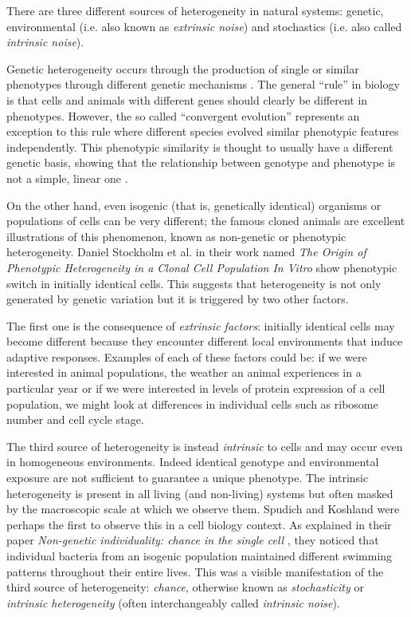 \documentclass[12pt,a4paper]{report}
\begin{document}
There are three different sources of heterogeneity in natural systems: genetic, environmental (i.e. also known as \emph{extrinsic noise}) and stochastics (i.e. also called \emph{intrinsic noise}).

Genetic heterogeneity occurs through the production of single or similar phenotypes through different genetic mechanisms \cite{GeneticHeterogeneity}. The general ``rule'' in biology is that cells and animals with different genes should clearly be different in phenotypes. However, the so called ``convergent evolution'' represents an exception to this rule where different species evolved similar phenotypic features independently. This phenotypic similarity is thought to usually have a different genetic basis, showing that the relationship between genotype and phenotype is not a simple, linear one \cite{genotypevsphenotype}. 

On the other hand, even isogenic (that is, genetically identical) organisms or populations of cells can be very different; the famous cloned animals are excellent illustrations of this phenomenon, known as non-genetic or phenotypic heterogeneity. Daniel Stockholm et al. in their work named \emph{The Origin of Phenotypic Heterogeneity in a Clonal Cell Population In Vitro}\cite{heterogeneityinclones} show phenotypic switch in initially identical cells. This suggests that heterogeneity is not only generated by genetic variation but it is triggered by two other factors.

The first one is the consequence of \emph{extrinsic factors}: initially identical cells may become different because they encounter different local environments that induce adaptive responses. Examples of each of these factors could be: if we were interested in animal populations, the weather an animal experiences in a particular year or if we were interested in levels of protein expression of a cell population, we might look at differences in individual cells such as ribosome number and cell cycle stage.

The third source of heterogeneity is instead \emph{intrinsic} to cells and may occur even in homogeneous environments. Indeed identical genotype and environmental exposure are not sufficient to guarantee a unique
phenotype. The intrinsic heterogeneity is present in all living (and non-living) systems but often masked by the macroscopic scale at which we observe them. Spudich and Koshland were perhaps the first to observe this in a cell biology context. As explained in their paper \emph{Non-genetic individuality: chance in the single cell} \cite{intrinsic}, they noticed that individual bacteria from an isogenic population maintained different swimming patterns throughout their entire lives. This was a visible manifestation of the third source of heterogeneity: \emph{chance}, otherwise known as \emph{stochasticity} or \emph{intrinsic heterogeneity} (often interchangeably called \emph{intrinsic noise}). 
\end{document}
